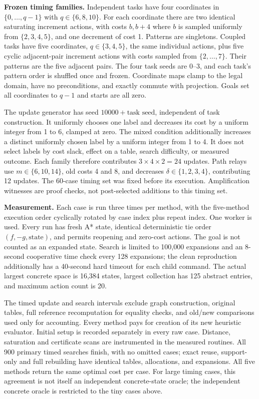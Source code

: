 \begin{sloppypar}
\textbf{Frozen timing families.} Independent tasks have four coordinates in $\{0,\ldots,q-1\}$ with $q\in\{6,8,10\}$. For each coordinate there are two identical saturating increment actions, with costs $b,b+4$ where $b$ is sampled uniformly from $\{2,3,4,5\}$, and one decrement of cost 1. Patterns are singletons. Coupled tasks have five coordinates, $q\in\{3,4,5\}$, the same individual actions, plus five cyclic adjacent-pair increment actions with costs sampled from $\{2,\ldots,7\}$. Their patterns are the five adjacent pairs. The four task seeds are 0--3, and each task's pattern order is shuffled once and frozen. Coordinate maps clamp to the legal domain, have no preconditions, and exactly commute with projection. Goals set all coordinates to $q-1$ and starts are all zero.
\end{sloppypar}

The update generator has seed $10000+\text{task seed}$, independent of task construction. It uniformly chooses one label and decreases its cost by a uniform integer from 1 to 6, clamped at zero. The mixed condition additionally increases a distinct uniformly chosen label by a uniform integer from 1 to 4. It does not select labels by cost slack, effect on a table, search difficulty, or measured outcome. Each family therefore contributes $3\times4\times2=24$ updates. Path relays use $m\in\{6,10,14\}$, old costs 4 and 8, and decreases $\delta\in\{1,2,3,4\}$, contributing 12 updates. The 60-case timing set was fixed before its execution. Amplification witnesses are proof checks, not post-selected additions to this timing set.

\textbf{Measurement.} Each case is run three times per method, with the five-method execution order cyclically rotated by case index plus repeat index. One worker is used. Every run has fresh A* state, identical deterministic tie order $(f,-g,\text{state})$, and permits reopening and zero-cost actions. The goal is not counted as an expanded state. Search is limited to 100,000 expansions and an 8-second cooperative time check every 128 expansions; the clean reproduction additionally has a 40-second hard timeout for each child command. The actual largest concrete space is 16,384 states, largest collection has 125 abstract entries, and maximum action count is 20.

The timed update and search intervals exclude graph construction, original tables, full reference recomputation for equality checks, and old/new comparisons used only for accounting. Every method pays for creation of its new heuristic evaluator. Initial setup is recorded separately in every raw case. Distance, saturation and certificate scans are instrumented in the measured routines. All 900 primary timed searches finish, with no omitted cases; exact reuse, support-only and full rebuilding have identical tables, allocations, and expansions. All five methods return the same optimal cost per case. For large timing cases, this agreement is not itself an independent concrete-state oracle; the independent concrete oracle is restricted to the tiny cases above.


